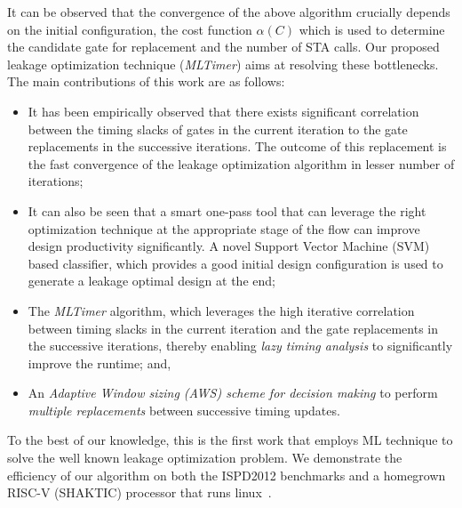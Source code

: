 \noindent It can be observed that the convergence of the above algorithm crucially depends on the initial configuration, the cost function $\alpha(C)$ which is used to determine the candidate gate for replacement and the number of STA calls.  Our proposed leakage optimization technique (\textit{MLTimer}) aims at resolving these bottlenecks. The main contributions of this work are as follows:
\begin{itemize} %
\item It has been empirically observed that there exists significant correlation between the timing slacks of gates in the current iteration to the gate replacements in the successive iterations. The outcome of this replacement is the fast convergence of the leakage optimization algorithm in lesser number of iterations;
     \item  It can also be seen that a smart one-pass tool that can leverage the right optimization technique at the appropriate stage of the flow can improve design productivity significantly. A novel Support Vector Machine (SVM) based classifier, which provides a good initial design configuration is used to generate a leakage optimal design at the end;
     \item The \textit{MLTimer} algorithm, which leverages the high iterative correlation between timing slacks in the current iteration and the gate replacements in the successive iterations, thereby enabling  {\em lazy timing analysis} to significantly improve the runtime; and, 
\item An {\em Adaptive Window sizing (AWS) scheme for decision making} to perform {\em multiple  replacements} between successive timing updates.

\end{itemize}
To the best of our knowledge, this is the first work that employs ML technique to solve the well known leakage optimization problem. We demonstrate the efficiency of our algorithm on both the ISPD2012 benchmarks and a homegrown RISC-V (SHAKTIC) processor that runs linux~\cite{riscv}. 


